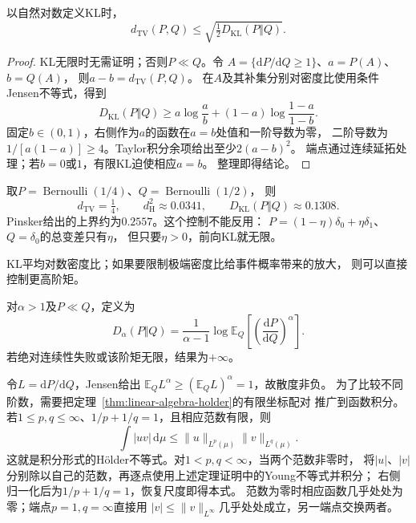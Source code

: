 \begin{theorem}[Pinsker不等式]
\label{thm:information-pinsker}
以自然对数定义KL时，
\begin{equation}
  d_{\mathrm{TV}}(P,Q)\leq
  \sqrt{\tfrac12D_{\mathrm{KL}}(P\Vert Q)}.
  \label{eq:information-pinsker}
\end{equation}
\end{theorem}
\begin{proof}
KL无限时无需证明；否则\(P\ll Q\)。令
\(A=\{\mathrm dP/\mathrm dQ\geq1\}\)、\(a=P(A)\)、\(b=Q(A)\)，
则\(a-b=d_{\mathrm{TV}}(P,Q)\)。
在\(A\)及其补集分别对密度比使用条件Jensen不等式，得到
\[
  D_{\mathrm{KL}}(P\Vert Q)\geq
  a\log\frac ab+(1-a)\log\frac{1-a}{1-b}.
\]
固定\(b\in(0,1)\)，右侧作为\(a\)的函数在\(a=b\)处值和一阶导数为零，
二阶导数为\(1/[a(1-a)]\geq4\)。Taylor积分余项给出至少\(2(a-b)^2\)。
端点通过连续延拓处理；若\(b=0\)或\(1\)，有限KL迫使相应\(a=b\)。
整理即得结论。
\end{proof}

取\(P=\operatorname{Bernoulli}(1/4)\)、\(Q=\operatorname{Bernoulli}(1/2)\)，
则
\[
  d_{\mathrm{TV}}=\tfrac14,\qquad
  d_{\mathrm H}^2\approx0.0341,\qquad
  D_{\mathrm{KL}}(P\Vert Q)\approx0.1308.
\]
Pinsker给出的上界约为\(0.2557\)。这个控制不能反用：
\(P=(1-\eta)\delta_0+\eta\delta_1\)、\(Q=\delta_0\)的总变差只有\(\eta\)，
但只要\(\eta>0\)，前向KL就无限。

KL平均对数密度比；如果要限制极端密度比给事件概率带来的放大，
则可以直接控制更高阶矩。

\begin{definition}[高于一阶的Rényi散度]
\label{def:information-renyi-divergence}
对\(\alpha>1\)及\(P\ll Q\)，定义为
\begin{equation}
  D_\alpha(P\Vert Q)
   =\frac1{\alpha-1}\log\mathbb E_Q
       \left[\left(\frac{\mathrm dP}{\mathrm dQ}\right)^\alpha\right].
  \label{eq:information-renyi-divergence}
\end{equation}
若绝对连续性失败或该阶矩无限，结果为\(+\infty\)。
\end{definition}

令\(L=\mathrm dP/\mathrm dQ\)，Jensen给出
\(\mathbb E_Q L^\alpha\geq(\mathbb E_QL)^\alpha=1\)，故散度非负。
为了比较不同阶数，需要把定理~\ref{thm:linear-algebra-holder}的有限坐标配对
推广到函数积分。若\(1\leq p,q\leq\infty\)、\(1/p+1/q=1\)，且相应范数有限，则
\begin{equation}
 \int|uv|\,\mathrm d\mu\leq
 \|u\|_{L^p(\mu)}\|v\|_{L^q(\mu)}.
 \label{eq:information-integral-holder}
\end{equation}
这就是积分形式的Hölder不等式。对\(1<p,q<\infty\)，当两个范数非零时，
将\(|u|\)、\(|v|\)分别除以自己的范数，再逐点使用上述定理证明中的Young不等式并积分；
右侧归一化后为\(1/p+1/q=1\)，恢复尺度即得本式。
范数为零时相应函数几乎处处为零；端点\(p=1,q=\infty\)直接用
\(|v|\leq\|v\|_{L^\infty}\)几乎处处成立，另一端点交换两者。

